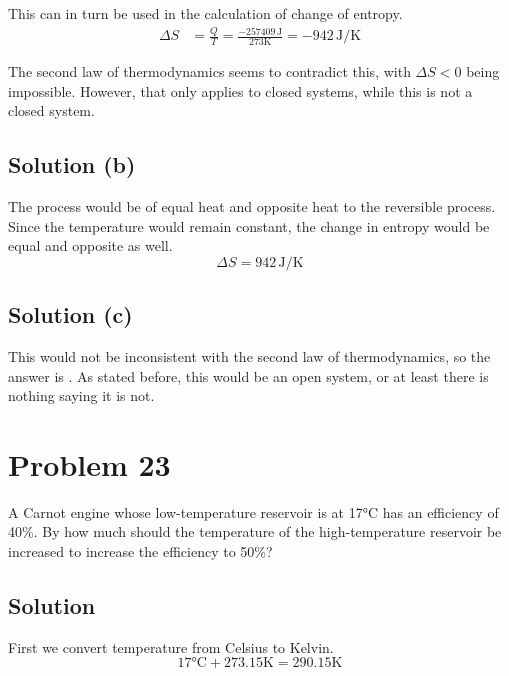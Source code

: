 \documentclass[12pt]{article}
\begin{document}
            This can in turn be used in the calculation of change of entropy.
            \begin{align}
                \Delta S    &=  \frac{Q}{T}
                    =   \frac{-257409\,\unit{\joule}}{273\unit{\kelvin}}
                    =   \boxed{-942\,\unit{\joule/\kelvin}}
            \end{align}

            The second law of thermodynamics seems to contradict this, with $\Delta S < 0$ being impossible.
            However, that only applies to closed systems, while this is not a closed system.

        \subsection{Solution (b)}
            The process would be of equal heat and opposite heat to the reversible process.
            Since the temperature would remain constant, the change in entropy would be equal and opposite as well.
            \begin{equation}
                \Delta S    =   \boxed{942\,\unit{\joule/\kelvin}}
            \end{equation}

        \subsection{Solution (c)}
            This would not be inconsistent with the second law of thermodynamics, so the answer is .
            As stated before, this would be an open system, or at least there is nothing saying it is not.

    \pagebreak
    \section{Problem 23}
        A Carnot engine whose low-temperature reservoir is at 17\unit{\celsius} has an efficiency of 40\%. 
        By how much should the temperature of the high-temperature reservoir be increased to increase the efficiency to 50\%?

        \subsection{Solution}
            First we convert temperature from Celsius to Kelvin.
            \begin{equation}
                17\unit{\celsius} + 273.15\unit{\kelvin} = 290.15\unit{\kelvin}
            \end{equation}
\end{document}
